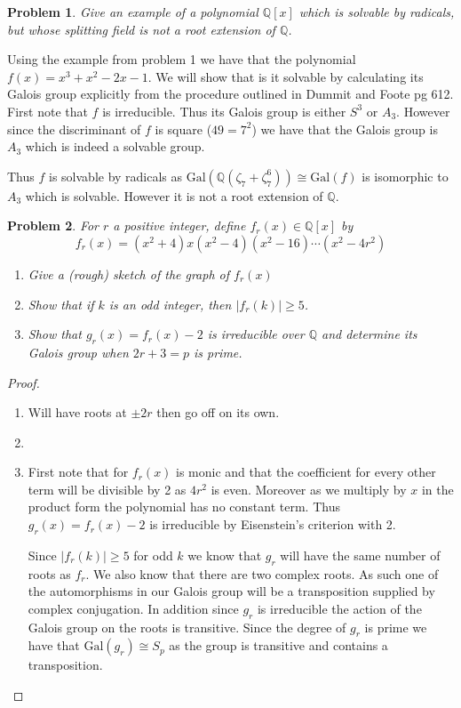 \documentclass[10pt]{article}
\newcommand{\sk}{\vskip 10mm}
\newcommand{\bb}[1]{\mathbb{#1}}
\theoremstyle{plain}
\newtheorem{problem}{Problem}
\theoremstyle{remark}
\begin{document}
\sk

\begin{problem}
  Give an example of a polynomial $\bb{Q}[x]$ which is solvable by radicals,
  but whose splitting field is not a root extension of $\bb{Q}$.
\end{problem}

Using the example from problem 1 we have that the polynomial
$f(x)=x^3+x^2-2x-1$. We will show that is it solvable by calculating its Galois
group explicitly from the procedure outlined in Dummit and Foote pg 612.
First note that $f$ is irreducible. Thus its Galois group is either
$S^3$ or $A_3$. However since the discriminant of $f$ is square ($49=7^2$) we
have that the Galois group is $A_3$ which is indeed a solvable group.

Thus $f$ is solvable by radicals as
$\text{Gal}(\bb{Q}(\zeta_7+\zeta_7^6))\cong\text{Gal}(f)$ is isomorphic to $A_3$ which is
solvable. However it is not a root extension of $\bb{Q}$.

\sk

\begin{problem}
  For $r$ a positive integer, define $f_r(x)\in\bb{Q}[x]$ by
  \[
    f_r(x)=(x^2+4)x(x^2-4)(x^2-16)\cdots(x^2-4r^2)
  \]
  \begin{enumerate}
  \item[(a)] Give a (rough) sketch of the graph of $f_r(x)$
  \item[(b)] Show that if $k$ is an odd integer, then $|f_r(k)|\geq 5$.
  \item[(c)] Show that $g_r(x)=f_r(x)-2$ is irreducible over $\bb{Q}$ and
    determine its Galois group when $2r+3=p$ is prime.
  \end{enumerate}
\end{problem}

\begin{proof}
  \begin{enumerate}
  \item[(a)] Will have roots at $\pm 2r$ then go off on its own.
  \item[(b)] 
  \item[(c)] First note that for $f_r(x)$ is monic and that the coefficient
    for every other term will be divisible by 2 as $4r^2$ is even. Moreover
    as we multiply by $x$ in the product form the polynomial has no constant
    term. Thus $g_r(x)=f_r(x)-2$ is irreducible by Eisenstein's criterion with
    2.

    Since $|f_r(k)|\geq 5$ for odd $k$ we know that $g_r$ will have the same
    number of roots as $f_r$. We also know that there are two complex
    roots. As such one of the automorphisms in our Galois group will
    be a transposition supplied by complex conjugation. In addition since $g_r$
    is irreducible the action of the Galois group on the roots is transitive.
    Since the degree of $g_r$ is prime we have that $\text{Gal}(g_r)\cong S_p$
    as the group is transitive and contains a transposition.
  \end{enumerate}
\end{proof}

\end{document}
